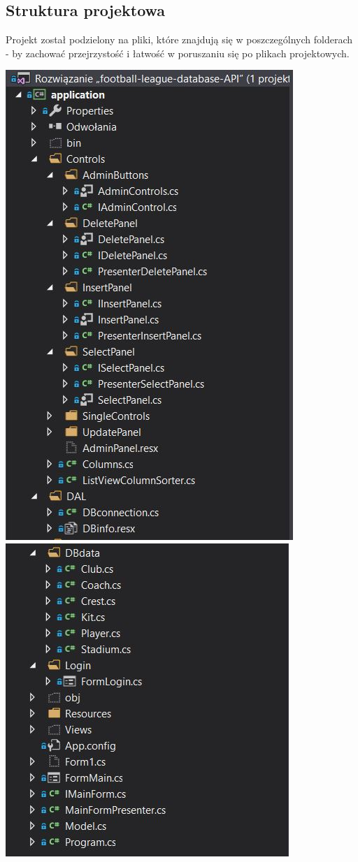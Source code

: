 \documentclass[12pt,a4paper]{article}
\begin{document}
    \subsection{Struktura projektowa}
    Projekt został podzielony na pliki, które znajdują się w poszczególnych folderach - by zachować przejrzystość i łatwość w poruszaniu się po plikach projektowych.
    \begin{center}
        \includegraphics[scale=1]{struct.JPG} \\
        \includegraphics[scale=1]{struct2.JPG}
    \end{center}
\end{document}
